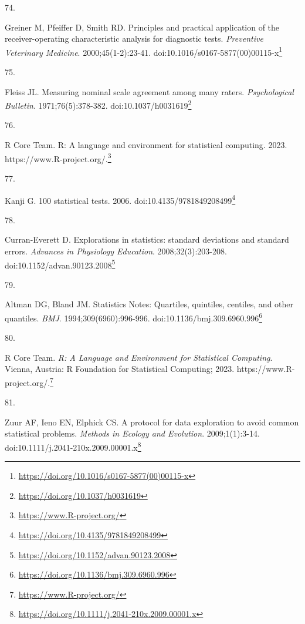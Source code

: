 \documentclass[
  a4paper,
]{book}
\newlength{\cslhangindent}
\newlength{\csllabelwidth}
\newlength{\cslentryspacingunit} %
\newenvironment{CSLReferences}[2] %
 {%
  \setlength{\parindent}{0pt}
  \ifodd #1
  \let\oldpar\par
  \def\par{\hangindent=\cslhangindent\oldpar}
  \fi
  \setlength{\parskip}{#2\cslentryspacingunit}
 }%
 {}
\newcommand{\CSLLeftMargin}[1]{\parbox[t]{\csllabelwidth}{#1}}
\newcommand{\CSLRightInline}[1]{\parbox[t]{\linewidth - \csllabelwidth}{#1}\break}
\renewcommand{\href}[2]{#2\footnote{\url{#1}}}
\begin{document}
\begin{CSLReferences}{0}{0}
\leavevmode{}%
\CSLLeftMargin{74. }%
\CSLRightInline{Greiner M, Pfeiffer D, Smith RD. Principles and practical application of the receiver-operating characteristic analysis for diagnostic tests. \emph{Preventive Veterinary Medicine}. 2000;45(1-2):23-41. doi:\href{https://doi.org/10.1016/s0167-5877(00)00115-x}{10.1016/s0167-5877(00)00115-x}}

\leavevmode{}%
\CSLLeftMargin{75. }%
\CSLRightInline{Fleiss JL. Measuring nominal scale agreement among many raters. \emph{Psychological Bulletin}. 1971;76(5):378-382. doi:\href{https://doi.org/10.1037/h0031619}{10.1037/h0031619}}

\leavevmode{}%
\CSLLeftMargin{76. }%
\CSLRightInline{R Core Team. R: A language and environment for statistical computing. 2023. \href{https://www.R-project.org/}{https://www.R-project.org/.}}

\leavevmode{}%
\CSLLeftMargin{77. }%
\CSLRightInline{Kanji G. 100 statistical tests. 2006. doi:\href{https://doi.org/10.4135/9781849208499}{10.4135/9781849208499}}

\leavevmode{}%
\CSLLeftMargin{78. }%
\CSLRightInline{Curran-Everett D. Explorations in statistics: standard deviations and standard errors. \emph{Advances in Physiology Education}. 2008;32(3):203-208. doi:\href{https://doi.org/10.1152/advan.90123.2008}{10.1152/advan.90123.2008}}

\leavevmode{}%
\CSLLeftMargin{79. }%
\CSLRightInline{Altman DG, Bland JM. Statistics Notes: Quartiles, quintiles, centiles, and other quantiles. \emph{BMJ}. 1994;309(6960):996-996. doi:\href{https://doi.org/10.1136/bmj.309.6960.996}{10.1136/bmj.309.6960.996}}

\leavevmode{}%
\CSLLeftMargin{80. }%
\CSLRightInline{R Core Team. \emph{{R}: A Language and Environment for Statistical Computing}. Vienna, Austria: R Foundation for Statistical Computing; 2023. \href{https://www.R-project.org/}{https://www.R-project.org/.}}

\leavevmode{}%
\CSLLeftMargin{81. }%
\CSLRightInline{Zuur AF, Ieno EN, Elphick CS. A protocol for data exploration to avoid common statistical problems. \emph{Methods in Ecology and Evolution}. 2009;1(1):3-14. doi:\href{https://doi.org/10.1111/j.2041-210x.2009.00001.x}{10.1111/j.2041-210x.2009.00001.x}}


\end{CSLReferences}
\end{document}
